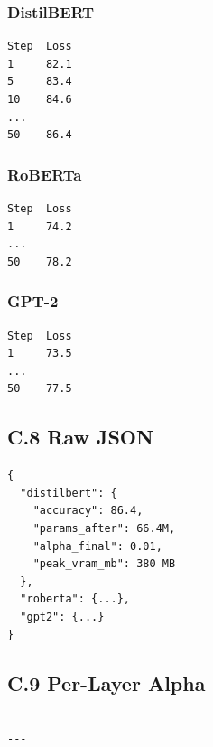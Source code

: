 \subsubsection{DistilBERT}

\begin{lstlisting}
Step  Loss
1     82.1
5     83.4
10    84.6
...
50    86.4
\end{lstlisting}

\subsubsection{RoBERTa}

\begin{lstlisting}
Step  Loss
1     74.2
...
50    78.2
\end{lstlisting}

\subsubsection{GPT-2}

\begin{lstlisting}
Step  Loss
1     73.5
...
50    77.5
\end{lstlisting}

\subsection{C.8 Raw JSON}

\begin{lstlisting}
{
  "distilbert": {
    "accuracy": 86.4,
    "params_after": 66.4M,
    "alpha_final": 0.01,
    "peak_vram_mb": 380 MB
  },
  "roberta": {...},
  "gpt2": {...}
}
\end{lstlisting}

\subsection{C.9 Per-Layer Alpha}

\begin{lstlisting}

---
\end{lstlisting}